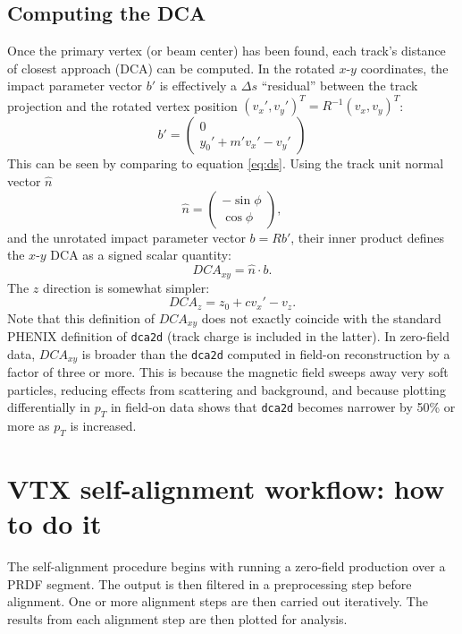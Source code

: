 \documentclass[12pt]{article}
\begin{document}
\subsection{Computing the DCA}
Once the primary vertex (or beam center) has been found, each track's distance of closest approach (DCA) can be computed. In the rotated $x$-$y$ coordinates, the impact parameter vector $b'$ is effectively a $\Delta s$ ``residual'' between the track projection and the rotated vertex position $(v_x', v_y')^T = R^{-1} (v_x, v_y)^T$:
\begin{equation} \label{eq:ipxy}
b' = 
\begin{pmatrix}
0 \\
y_0' + m' v_x' - v_y'
\end{pmatrix}
\end{equation}
This can be seen by comparing to equation \ref{eq:ds}. Using the track unit normal vector $\hat n$
\begin{equation} \label{eq:nhat}
\hat n = 
\begin{pmatrix}
-\sin \phi \\
\cos \phi
\end{pmatrix},
\end{equation}
and the unrotated impact parameter vector $b = R b'$, their inner product defines the $x$-$y$ DCA as a signed scalar quantity: 
\begin{equation} \label{eq:dcaxy}
DCA_{xy} = \hat n \cdot b.
\end{equation}
The $z$ direction is somewhat simpler:
\begin{equation} \label{eq:dcaz}
DCA_{z} = z_0 + c v_x' - v_z.
\end{equation}
Note that this definition of $DCA_{xy}$ does not exactly coincide with the standard PHENIX definition of \texttt{dca2d} (track charge is included in the latter). In zero-field data, $DCA_{xy}$ is broader than the \texttt{dca2d} computed in field-on reconstruction by a factor of three or more. This is because the magnetic field sweeps away very soft particles, reducing effects from scattering and background, and because plotting differentially in $p_T$ in field-on data shows that \texttt{dca2d} becomes narrower by 50\% or more as $p_T$ is increased. 


\section{VTX self-alignment workflow: how to do it}
The self-alignment procedure begins with running a zero-field production over a PRDF segment. The output is then filtered in a preprocessing step before alignment. One or more alignment steps are then carried out iteratively. The results from each alignment step are then plotted for analysis.
\end{document}
